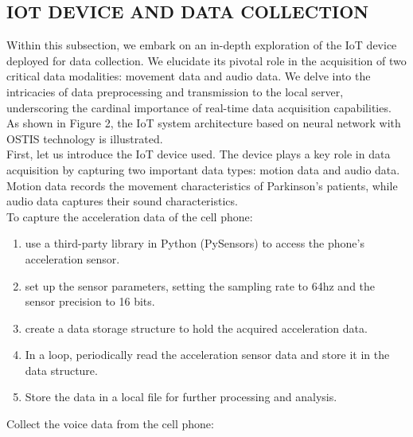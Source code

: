 \documentclass[10pt,two column]{article}
\begin{document}
\begin{SCn}
\section{\textbf{IOT DEVICE AND DATA COLLECTION}}
Within this subsection, we embark on an in-depth
exploration of the IoT device deployed for data collection.
We elucidate its pivotal role in the acquisition of two
critical data modalities: movement data and audio data.
We delve into the intricacies of data preprocessing and
transmission to the local server, underscoring the cardinal
importance of real-time data acquisition capabilities. As
shown in Figure 2, the IoT system architecture based on
neural network with OSTIS technology is illustrated. \\
First, let us introduce the IoT device used. The device
plays a key role in data acquisition by capturing two
important data types: motion data and audio data. Motion
data records the movement characteristics of Parkinson’s
patients, while audio data captures their sound characteristics. \\
To capture the acceleration data of the cell phone: \\
\begin{enumerate}[label=\arabic*)]
    \item use a third-party library in Python (PySensors) to access the phone’s acceleration sensor.
    \item set up the sensor parameters, setting the sampling rate to 64hz and the sensor precision to 16 bits.
    \item create a data storage structure to hold the acquired acceleration data.
    \item In a loop, periodically read the acceleration sensor data and store it in the data structure.
    \item Store the data in a local file for further processing and analysis.
\end{enumerate}
Collect the voice data from the cell phone:
\end{SCn}
\end{document}
